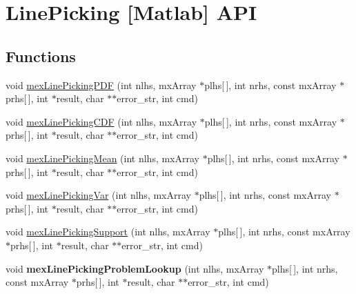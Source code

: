 \hypertarget{group__matlabapi}{\section{Line\-Picking \mbox{[}Matlab\mbox{]} A\-P\-I}
\label{group__matlabapi}
}
\subsection*{Functions}
\begin{DoxyCompactItemize}
\item 
void \hyperlink{group__matlabapi_ga415ab39c370dfeb66324d1a538a8bb7b}{mex\-Line\-Picking\-P\-D\-F} (int nlhs, mx\-Array $\ast$plhs\mbox{[}$\,$\mbox{]}, int nrhs, const mx\-Array $\ast$prhs\mbox{[}$\,$\mbox{]}, int $\ast$result, char $\ast$$\ast$error\-\_\-str, int cmd)
\item 
void \hyperlink{group__matlabapi_ga565be7534fefd6e5547869fdcb21b36f}{mex\-Line\-Picking\-C\-D\-F} (int nlhs, mx\-Array $\ast$plhs\mbox{[}$\,$\mbox{]}, int nrhs, const mx\-Array $\ast$prhs\mbox{[}$\,$\mbox{]}, int $\ast$result, char $\ast$$\ast$error\-\_\-str, int cmd)
\item 
void \hyperlink{group__matlabapi_ga6fe54a6aa7e3d2e51733dea1a443a1b2}{mex\-Line\-Picking\-Mean} (int nlhs, mx\-Array $\ast$plhs\mbox{[}$\,$\mbox{]}, int nrhs, const mx\-Array $\ast$prhs\mbox{[}$\,$\mbox{]}, int $\ast$result, char $\ast$$\ast$error\-\_\-str, int cmd)
\item 
void \hyperlink{group__matlabapi_gaceb40f4eec3174186785fca28818c09f}{mex\-Line\-Picking\-Var} (int nlhs, mx\-Array $\ast$plhs\mbox{[}$\,$\mbox{]}, int nrhs, const mx\-Array $\ast$prhs\mbox{[}$\,$\mbox{]}, int $\ast$result, char $\ast$$\ast$error\-\_\-str, int cmd)
\item 
void \hyperlink{group__matlabapi_gaa1d58f45751e79cccbc82eedccef460e}{mex\-Line\-Picking\-Support} (int nlhs, mx\-Array $\ast$plhs\mbox{[}$\,$\mbox{]}, int nrhs, const mx\-Array $\ast$prhs\mbox{[}$\,$\mbox{]}, int $\ast$result, char $\ast$$\ast$error\-\_\-str, int cmd)
\item 
\hypertarget{group__matlabapi_ga8b9723f66253c299cb2bd065c48d1d11}{void {\bfseries mex\-Line\-Picking\-Problem\-Lookup} (int nlhs, mx\-Array $\ast$plhs\mbox{[}$\,$\mbox{]}, int nrhs, const mx\-Array $\ast$prhs\mbox{[}$\,$\mbox{]}, int $\ast$result, char $\ast$$\ast$error\-\_\-str, int cmd)}\label{group__matlabapi_ga8b9723f66253c299cb2bd065c48d1d11}


\end{DoxyCompactItemize}
